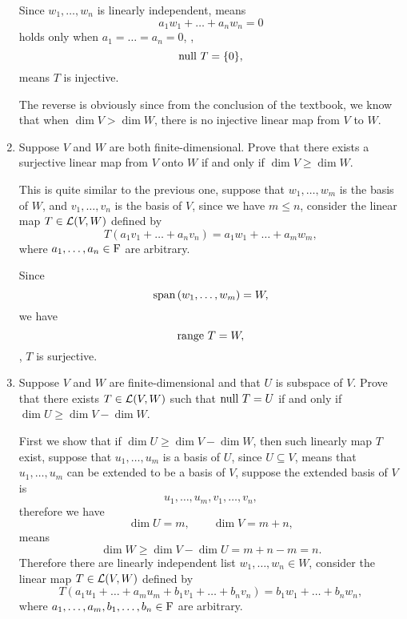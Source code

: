 \begin{enumerate}
\begin{solution}
            Since $w_1, \ldots, w_n$ is linearly independent, means 
            \[ a_1w_1 + \dots + a_nw_n = 0\]
            holds only when $a_1=\dots=a_n=0$, \ie,
            \[ \text{null}~T = \{0\},\]
            means $T$ is injective.

            The reverse is obviously since from the conclusion of the textbook, we know that when $\dim{V} > \dim{W}$, there 
            is no injective linear map from $V$ to $W$.
        \end{solution}
    \item Suppose $V$ and $W$ are both finite-dimensional. Prove that there exists a surjective linear map from 
        $V$ onto $W$ if and only if $\dim{V} \geq \dim{W}$.
        \begin{solution}
            This is quite similar to the previous one, suppose that $w_1, \ldots, w_m$ is the basis of $W$, and 
            $v_1, \ldots, v_n$ is the basis of $V$, since we have $m \leq n$, consider the linear map $T \in \mathcal{L}(V, W)$ defined by 
            \[ T(a_1v_1 + \dots + a_nv_n) = a_1w_1 + \dots + a_mw_m ,\]
            where $a_1, \ldots, a_n \in \mathrm{F}$ are arbitrary.

            Since 
            \[ \text{span}\left(w_1, \ldots, w_m\right) = W,\]
            we have 
            \[ \text{range}~T = W,\]
            \ie, $T$ is surjective.
        \end{solution}
    \item Suppose $V$ and $W$ are finite-dimensional and that $U$ is subspace of $V$. Prove that there exists $T \in \mathcal{L}(V, W)$ such that 
        $\text{null}~T = U$ if and only if $\dim{U} \geq \dim{V} - \dim{W}$.
        \begin{solution}
            First we show that if $\dim{U} \geq \dim{V} - \dim{W}$, then such linearly map $T$ exist, suppose that $u_1, \ldots, u_m$ is a basis of $U$,
            since $U \subseteq V$, means that $u_1,\ldots, u_m$ can be extended to be a basis of $V$, suppose the extended basis of $V$ is 
            \[ u_1, \ldots, u_m, v_1, \ldots, v_n ,\] 
            therefore we have 
            \[ \dim{U} = m, \qquad \dim{V} = m+n,\]
            means 
            \[ \dim{W} \geq \dim{V} - \dim{U} = m+n-m = n.\]
            Therefore there are linearly independent list $w_1, \ldots, w_n \in W$, consider the linear map $T \in \mathcal{L}(V, W)$ defined by
            \[ T(a_1u_1+\dots+a_mu_m+b_1v_1+\dots+b_nv_n) = b_1w_1 + \dots + b_nw_n, \]
            where $a_1,\ldots,a_m,b_1,\ldots,b_n \in \mathrm{F}$ are arbitrary.


\end{solution}
\end{enumerate}
